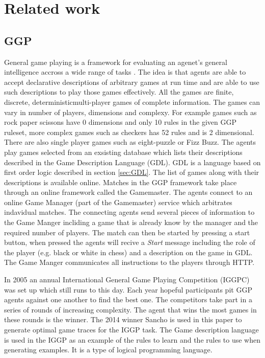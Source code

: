 \chapter{Related work}

\section{GGP}
General game playing is a framework for evaluating an agenet's general intelligence accross a wide range of tasks \cite{Cropper/IGGP}. The idea is that agents are able to accept declarative descriptions of arbitrary games at run time and are able to use such descriptions to play those games effectively. All the games are finite, discrete, deterministicmulti-player games of complete information. The games can vary in number of players, dimensions and complexy. For example games such as rock paper scissons have 0 dimensions and only 10 rules in the given GGP ruleset, more complex games such as checkers has 52 rules and is 2 dimensional. There are also single player games such as eight-puzzle or Fizz Buzz. The agents play games selected from an exsisting database which lists their descriptions described in the Game Description Language (GDL). GDL is a language based on first order logic described in section \ref{sec:GDL}. The list of games along with their descriptions is available online\cite{GGP-Website}. Matches in the GGP framework take place through an online framework called the Gamemaster. The agents connect to an online Game Manager (part of the Gamemaster) service which arbitrates indavidual matches. The connecting agents send several pieces of information to the Game Manger incliding a game that is already know by the manager and the required number of players. The match can then be started by pressing a start button, when pressed the agents will recive a \textit{Start} message including the role of the player (e.g. black or white in chess) and a description on the game in GDL. The Game Manger communicates all instructions to the players through HTTP\cite{Genesereth/GGPOverview}.

In 2005 an annual International General Game Playing Competition (IGGPC) was set up which still runs to this day. Each year hopeful participants pit GGP agents against one another to find the best one. The competitors take part in a series of rounds of increasing complexity. The agent that wins the most games in these rounds is the winner. The 2014 winner Sancho is used in this paper to generate optimal game traces for the IGGP task. The Game description language is used in the IGGP as an example of the rules to learn and the rules to use when generating examples. It is a type of logical programming language.

